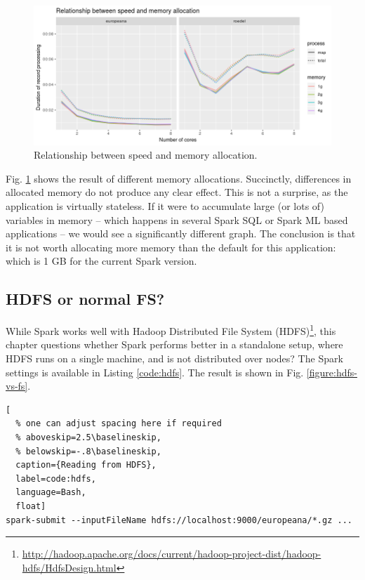 \begin{figure}
\includegraphics[width=\textwidth]{images/chapter06/memory-allocation-details.png}
\caption{Relationship between speed and memory allocation.}
\label{figure:memory-allocation-details}
\end{figure}

Fig. \ref{figure:memory-allocation-details} shows the result of different memory allocations. Succinctly, differences in allocated memory do not produce any clear effect. This is not a surprise, as the application is virtually stateless. If it were to accumulate large (or lots of) variables in memory -- which happens in several Spark SQL or Spark ML based applications -- we would see a significantly different graph. The conclusion is that it is not worth allocating more memory than the default for this application: which is 1 GB for the current Spark version.

\subsection{HDFS or normal FS?}

While Spark works well with Hadoop Distributed File System (HDFS)\footnote{\url{http://hadoop.apache.org/docs/current/hadoop-project-dist/hadoop-hdfs/HdfsDesign.html}}, this chapter questions whether Spark performs better in a standalone setup, where HDFS runs on a single machine, and is not distributed over nodes? The Spark settings is available in Listing \ref{code:hdfs}. The result is shown in Fig. \ref{figure:hdfs-vs-fs}.

\begin{lstlisting}[
  % one can adjust spacing here if required
  % aboveskip=2.5\baselineskip,
  % belowskip=-.8\baselineskip,
  caption={Reading from HDFS},
  label=code:hdfs,
  language=Bash,
  float]
spark-submit --inputFileName hdfs://localhost:9000/europeana/*.gz ...
\end{lstlisting}


